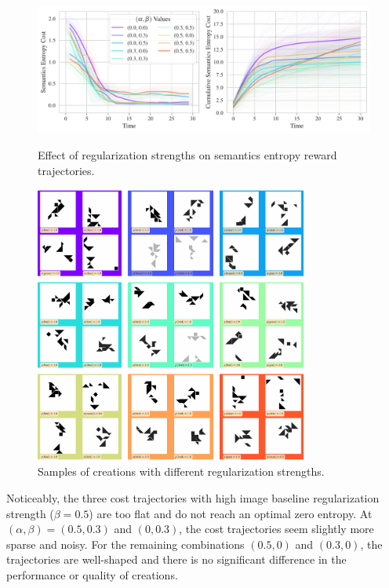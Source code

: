 \begin{figure}[H]
    \centering
    \includegraphics[width=\textwidth]{images/alpha_beta_comparison.pdf}
    \caption{Effect of regularization strengths on semantics entropy reward trajectories.}
    \label{fig:alpha-beta-trajectories}
    \vspace{12pt}
    \includegraphics[width=0.8\textwidth]{images/alpha_beta_samples.pdf}
    \caption{Samples of creations with different regularization strengths.}
    \label{fig:alpha-beta-samples}
\end{figure}
\vspace{-11pt}

Noticeably, the three cost trajectories with high image baseline regularization strength (\(\beta = 0.5\)) are too flat and do not reach an optimal zero entropy.
At \((\alpha, \beta) = (0.5, 0.3)\) and \((0, 0.3)\), the cost trajectories seem slightly more sparse and noisy.
For the remaining combinations \((0.5, 0)\) and \((0.3, 0)\), the trajectories are well-shaped and there is no significant difference in the performance or quality of creations.

